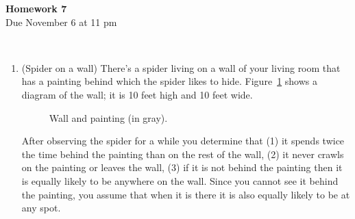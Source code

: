 \documentclass[12pt,twoside]{article}
\begin{document}
\begin{center}
{\large{\textbf{Homework 7}} } \vspace{0.2cm}\\
Due November 6 at 11 pm
\\
\end{center}
\\

\begin{enumerate}

\item (Spider on a wall) There's a spider living on a wall of your living room that has a painting behind which the spider likes to hide. Figure~\ref{fig:wall} shows a diagram of the wall; it is 10 feet high and 10 feet wide.
\begin{figure}[h]
\begin{center}
\end{center}
\caption{Wall and painting (in gray).}
\label{fig:wall}
\end{figure}

After observing the spider for a while you determine that (1) it spends twice the time behind the painting than on the rest of the wall, (2) it never crawls on the painting or leaves the wall, (3) if it is not behind the painting then it is equally likely to be anywhere on the wall. Since you cannot see it behind the painting, you assume that when it is there it is also equally likely to be at any spot.


\end{enumerate}
\end{document}
